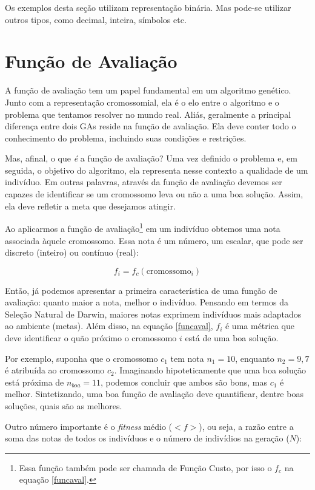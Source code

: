 Os exemplos desta seção utilizam representação binária. Mas pode-se utilizar outros tipos, como decimal, inteira, símbolos etc.
	
	\section{Função de Avaliação}
	
	A função de avaliação tem um papel fundamental em um algoritmo genético. Junto com a representação cromossomial, ela é o elo entre o algoritmo e o problema que tentamos resolver no mundo real. Aliás, geralmente a principal diferença entre dois GAs reside na função de avaliação. Ela deve conter todo o conhecimento do problema, incluindo suas condições e restrições.
	
	Mas, afinal, o que \textit{é} a função de avaliação? Uma vez definido o problema e, em seguida, o objetivo do algoritmo, ela representa nesse contexto a qualidade de um indivíduo. Em outras palavras, através da função de avaliação devemos ser capazes de identificar se um cromossomo leva ou não a uma boa solução. Assim, ela deve refletir a meta que desejamos atingir.
	
	Ao aplicarmos a função de avaliação\footnote{Essa função também pode ser chamada de Função Custo, por isso o $f_c$ na equação \ref{funcaval}.} em um indivíduo obtemos uma nota associada àquele cromossomo. Essa nota é um número, um escalar, que pode ser discreto (inteiro) ou contínuo (real):
	
	\begin{equation}\label{funcaval}
		f_i = f_c(\mbox{cromossomo}_i)
	\end{equation}
	
	Então, já podemos apresentar a primeira característica de uma função de avaliação: quanto maior a nota, melhor o indivíduo. Pensando em termos da Seleção Natural de Darwin, maiores notas exprimem indivíduos mais adaptados ao ambiente (metas). Além disso, na equação \ref{funcaval}, $f_i$ é uma métrica que deve identificar o quão próximo o cromossomo $i$ está de uma boa solução.
	
	Por exemplo, suponha que o cromossomo $c_1$ tem nota $n_1 = 10$, enquanto $n_2 = 9,7$ é atribuída ao cromossomo $c_2$. Imaginando hipoteticamente que uma boa solução está próxima de $n_{boa} = 11$, podemos concluir que ambos são bons, mas $c_1$ é melhor. Sintetizando, uma boa função de avaliação deve quantificar, dentre boas soluções, quais são as melhores.
	
	Outro número importante é o \textit{fitness} médio ($<f>$), ou seja, a razão entre a soma das notas de todos os indivíduos e o número de indivídios na geração ($N$):
	
